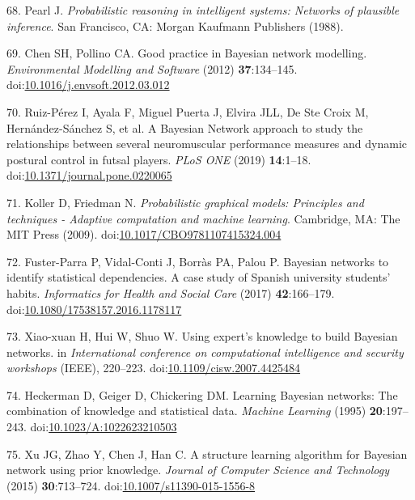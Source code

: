 \documentclass[
  english,
  man]{apa6}
\newenvironment{cslreferences}%
  {}%
  {\par}
\begin{document}
\begin{cslreferences}
\leavevmode\hypertarget{ref-Pearl1988}{}%
68. Pearl J. \emph{Probabilistic reasoning in intelligent systems: Networks of plausible inference}. San Francisco, CA: Morgan Kaufmann Publishers (1988).

\leavevmode\hypertarget{ref-Chen2012}{}%
69. Chen SH, Pollino CA. Good practice in Bayesian network modelling. \emph{Environmental Modelling and Software} (2012) \textbf{37}:134--145. doi:\href{https://doi.org/10.1016/j.envsoft.2012.03.012}{10.1016/j.envsoft.2012.03.012}

\leavevmode\hypertarget{ref-Ruiz-Perez2019}{}%
70. Ruiz-Pérez I, Ayala F, Miguel Puerta J, Elvira JLL, De Ste Croix M, Hernández-Sánchez S, et al. A Bayesian Network approach to study the relationships between several neuromuscular performance measures and dynamic postural control in futsal players. \emph{PLoS ONE} (2019) \textbf{14}:1--18. doi:\href{https://doi.org/10.1371/journal.pone.0220065}{10.1371/journal.pone.0220065}

\leavevmode\hypertarget{ref-Koller2009}{}%
71. Koller D, Friedman N. \emph{Probabilistic graphical models: Principles and techniques - Adaptive computation and machine learning}. Cambridge, MA: The MIT Press (2009). doi:\href{https://doi.org/10.1017/CBO9781107415324.004}{10.1017/CBO9781107415324.004}

\leavevmode\hypertarget{ref-Fuster-Parra2017}{}%
72. Fuster-Parra P, Vidal-Conti J, Borràs PA, Palou P. Bayesian networks to identify statistical dependencies. A case study of Spanish university students' habits. \emph{Informatics for Health and Social Care} (2017) \textbf{42}:166--179. doi:\href{https://doi.org/10.1080/17538157.2016.1178117}{10.1080/17538157.2016.1178117}

\leavevmode\hypertarget{ref-Xiao-xuan2007}{}%
73. Xiao-xuan H, Hui W, Shuo W. Using expert's knowledge to build Bayesian networks. in \emph{International conference on computational intelligence and security workshops} (IEEE), 220--223. doi:\href{https://doi.org/10.1109/cisw.2007.4425484}{10.1109/cisw.2007.4425484}

\leavevmode\hypertarget{ref-Heckerman1995}{}%
74. Heckerman D, Geiger D, Chickering DM. Learning Bayesian networks: The combination of knowledge and statistical data. \emph{Machine Learning} (1995) \textbf{20}:197--243. doi:\href{https://doi.org/10.1023/A:1022623210503}{10.1023/A:1022623210503}

\leavevmode\hypertarget{ref-Xu2015}{}%
75. Xu JG, Zhao Y, Chen J, Han C. A structure learning algorithm for Bayesian network using prior knowledge. \emph{Journal of Computer Science and Technology} (2015) \textbf{30}:713--724. doi:\href{https://doi.org/10.1007/s11390-015-1556-8}{10.1007/s11390-015-1556-8}


\end{cslreferences}
\end{document}
